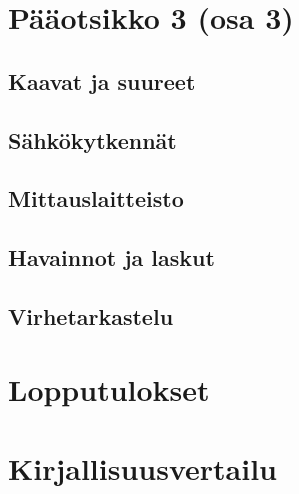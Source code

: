 \documentclass[a4paper,12pt]{article}
\begin{document}
\section{Pääotsikko 3 (osa 3)}

\subsection{Kaavat ja suureet}

\subsection{Sähkökytkennät}

\subsection{Mittauslaitteisto}

\subsection{Havainnot ja laskut}

\subsection{Virhetarkastelu}


\section{Lopputulokset}



\section{Kirjallisuusvertailu}

\end{document}
